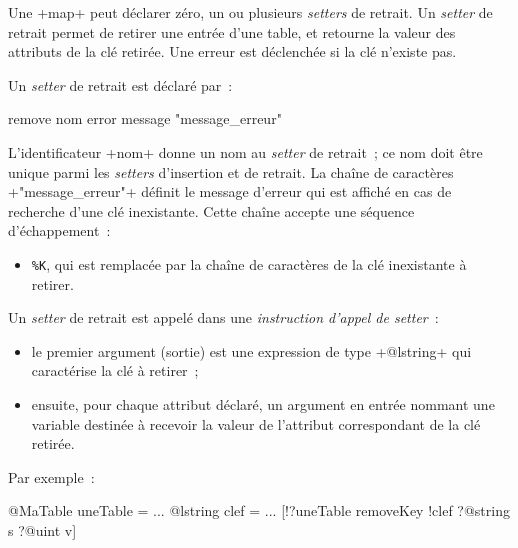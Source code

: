 
Une \ggst+map+ peut déclarer zéro, un ou plusieurs \emph{setters} de retrait. Un \emph{setter} de retrait permet de retirer une entrée d'une table, et retourne la valeur des attributs de la clé retirée. Une erreur est déclenchée si la clé n'existe pas.


Un \emph{setter} de retrait est déclaré par~:

\begin{galgas3}
remove nom error message "message_erreur"
\end{galgas3}

\begin{galgas4}
\end{galgas4}

L'identificateur \ggst+nom+ donne un nom au \emph{setter} de retrait~; ce nom doit être unique parmi les \emph{setters} d'insertion et de retrait. La chaîne de caractères \ggst+"message_erreur"+ définit le message d'erreur qui est affiché en cas de recherche d'une clé inexistante. Cette chaîne accepte une séquence d'échappement~:
\begin{itemize}
  \item \texttt{\%K}, qui est remplacée par la chaîne de caractères de la clé inexistante à retirer.
\end{itemize}


Un \emph{setter} de retrait est appelé dans une \emph{instruction d'appel de setter}~:
\begin{itemize}
  \item le premier argument (sortie) est une expression de type \ggst+@lstring+ qui caractérise la clé à retirer~;
  \item ensuite, pour chaque attribut déclaré, un argument en entrée nommant une variable destinée à recevoir la valeur de l'attribut correspondant de la clé retirée.
\end{itemize}

Par exemple~:
\begin{galgas3}
@MaTable uneTable = {}
...
@lstring clef = ...
[!?uneTable removeKey !clef ?@string s ?@uint v]
\end{galgas3}










